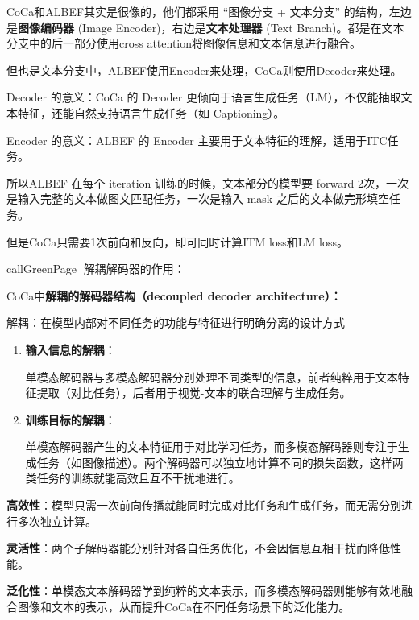 \documentclass[zihao=false,fontset=windows]{ctexart}
\begin{document}
CoCa和ALBEF其实是很像的，他们都采用 “图像分支 + 文本分支” 的结构，左边是\textbf{图像编码器} (Image Encoder)，右边是\textbf{文本处理器} (Text Branch)。都是在文本分支中的后一部分使用cross attention将图像信息和文本信息进行融合。\par
但也是文本分支中，ALBEF使用Encoder来处理，CoCa则使用Decoder来处理。\par
\begin{feishuquote}
Decoder 的意义：CoCa 的 Decoder 更倾向于语言生成任务（LM），不仅能抽取文本特征，还能自然支持语言生成任务（如 Captioning）。\par
Encoder 的意义：ALBEF 的 Encoder 主要用于文本特征的理解，适用于ITC任务。\par
\end{feishuquote}
所以ALBEF 在每个 iteration 训练的时候，文本部分的模型要 forward 2次，一次是输入完整的文本做图文匹配任务，一次是输入 mask 之后的文本做完形填空任务。\par
但是CoCa只需要1次前向和反向，即可同时计算ITM loss和LM loss。\par

\begin{feishubox}{callGreenPage}{🙋}
解耦解码器的作用：\par
\begin{feishuquotenb}
CoCa中\textbf{解耦的解码器结构（decoupled decoder architecture）：}\par
解耦：在模型内部对不同任务的功能与特征进行明确分离的设计方式\par
\begin{enumerate}
\item \textbf{输入信息的解耦}：\par
单模态解码器与多模态解码器分别处理不同类型的信息，前者纯粹用于文本特征提取（对比任务），后者用于视觉-文本的联合理解与生成任务。
\item \textbf{训练目标的解耦}：\par
单模态解码器产生的文本特征用于对比学习任务，而多模态解码器则专注于生成任务（如图像描述）。两个解码器可以独立地计算不同的损失函数，这样两类任务的训练就能高效且互不干扰地进行。
\end{enumerate}
\end{feishuquotenb}
\textbf{高效性}：模型只需一次前向传播就能同时完成对比任务和生成任务，而无需分别进行多次独立计算。\par
\textbf{灵活性}：两个子解码器能分别针对各自任务优化，不会因信息互相干扰而降低性能。\par
\textbf{泛化性}：单模态文本解码器学到纯粹的文本表示，而多模态解码器则能够有效地融合图像和文本的表示，从而提升CoCa在不同任务场景下的泛化能力。\par
\end{feishubox}
\end{document}
